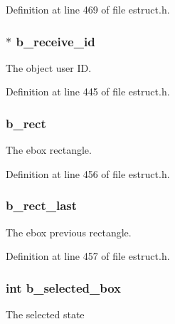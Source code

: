 Definition at line 469 of file estruct.\-h.

\hypertarget{struct__ebox_a3fb2b6968877ffd009753ccc0fe96769}{
\subsubsection[{b\-\_\-receive\-\_\-id}]{$\ast$ b\-\_\-receive\-\_\-id}}\label{struct__ebox_a3fb2b6968877ffd009753ccc0fe96769}
The object user I\-D. 

Definition at line 445 of file estruct.\-h.

\hypertarget{struct__ebox_abc70ff46c135ee9f377a038bbc05a33e}{
\subsubsection[{b\-\_\-rect}]{ b\-\_\-rect}}\label{struct__ebox_abc70ff46c135ee9f377a038bbc05a33e}
The ebox rectangle. 

Definition at line 456 of file estruct.\-h.

\hypertarget{struct__ebox_a2a0a15d3bc005cd4f815088b230b5ebd}{
\subsubsection[{b\-\_\-rect\-\_\-last}]{ b\-\_\-rect\-\_\-last}}\label{struct__ebox_a2a0a15d3bc005cd4f815088b230b5ebd}
The ebox previous rectangle. 

Definition at line 457 of file estruct.\-h.

\hypertarget{struct__ebox_acc1a127070b19ccf6e222d7349c84c96}{
\subsubsection[{b\-\_\-selected\-\_\-box}]{\setlength{\rightskip}{0pt plus 5cm}int b\-\_\-selected\-\_\-box}}\label{struct__ebox_acc1a127070b19ccf6e222d7349c84c96}
The selected state 

